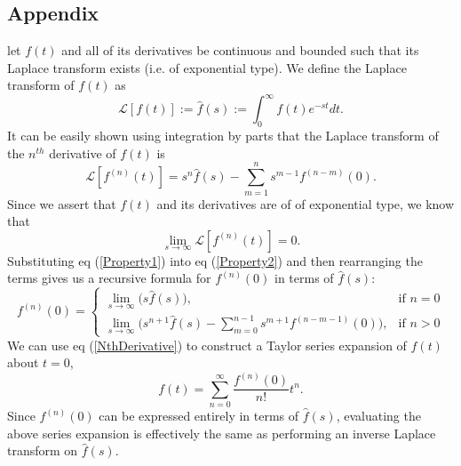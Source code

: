\documentclass[12pt]{article}
\begin{document}
\subsection{Appendix}
let $f(t)$ and all of its derivatives be continuous and bounded such
that its Laplace transform exists (i.e. of exponential type).  We
define the Laplace transform of $f(t)$ as
\begin{equation}
  \mathcal{L}[f(t)] := \hat{f}(s) := \int_{0}^\infty f(t)e^{-st}dt.
\end{equation}
It can be easily shown using integration by parts that the Laplace
transform of the $n^{th}$ derivative of $f(t)$ is
\begin{equation}\label{Property1}
  \mathcal{L}[f^{(n)}(t)] = s^n\hat{f}(s) - \sum_{m=1}^ns^{m-1}f^{(n-m)}(0).
\end{equation}
Since we assert that $f(t)$ and its derivatives are of of exponential
type, we know that
\begin{equation}\label{Property2}
  \lim_{s \to \infty}\mathcal{L}[f^{(n)}(t)] = 0.
\end{equation}
Substituting eq (\ref{Property1}) into eq (\ref{Property2}) and then
rearranging the terms gives us a recursive formula for
$f^{(n)}(0)$ in terms of $\hat{f}(s)$:
\begin{equation}\label{NthDerivative}
  f^{(n)}(0) = 
  \begin{cases}
    \lim_{s \to \infty} \big( s\hat{f}(s)\big)\nonumber, &\text{if }n = 0\\
    \lim_{s \to \infty} \big( s^{n + 1}\hat{f}(s) - \sum_{m=0}^{n-1}
    s^{m+1}f^{(n-m-1)}(0)\big), &\text{if }n > 0
  \end{cases}
\end{equation}
We can use eq (\ref{NthDerivative}) to construct a Taylor series
expansion of $f(t)$ about $t=0$,
\begin{equation}
  f(t) = \sum_{n=0}^\infty\frac{f^{(n)}(0)}{n!}t^n.
\end{equation}
Since $f^{(n)}(0)$ can be expressed entirely in terms of
$\hat f(s)$, evaluating the above series expansion is effectively the
same as performing an inverse Laplace transform on $\hat f(s)$.
\end{document}
